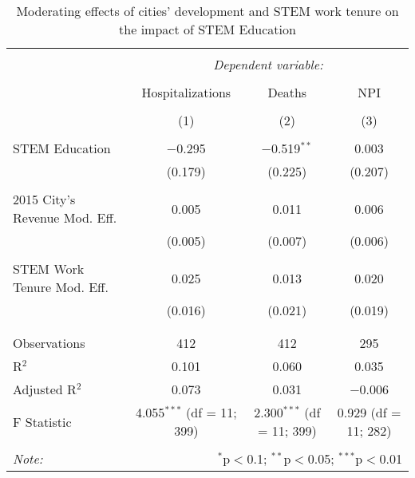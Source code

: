 
\begin{table}[!htbp] \centering 
  \caption{Moderating effects of cities’ development and STEM work tenure on the impact of STEM Education} 
  \label{} 
\begin{tabular}{@{\extracolsep{5pt}}lccc} 
\\[-1.8ex]\hline 
\hline \\[-1.8ex] 
 & \multicolumn{3}{c}{\textit{Dependent variable:}} \\ 
\cline{2-4} 
\\[-1.8ex] & Hospitalizations & Deaths & NPI \\ 
\\[-1.8ex] & (1) & (2) & (3)\\ 
\hline \\[-1.8ex] 
 STEM Education & $-$0.295 & $-$0.519$^{**}$ & 0.003 \\ 
  & (0.179) & (0.225) & (0.207) \\ 
  & & & \\ 
 2015 City's Revenue Mod. Eff. & 0.005 & 0.011 & 0.006 \\ 
  & (0.005) & (0.007) & (0.006) \\ 
  & & & \\ 
 STEM Work Tenure Mod. Eff. & 0.025 & 0.013 & 0.020 \\ 
  & (0.016) & (0.021) & (0.019) \\ 
  & & & \\ 
\hline \\[-1.8ex] 
Observations & 412 & 412 & 295 \\ 
R$^{2}$ & 0.101 & 0.060 & 0.035 \\ 
Adjusted R$^{2}$ & 0.073 & 0.031 & $-$0.006 \\ 
F Statistic & 4.055$^{***}$ (df = 11; 399) & 2.300$^{***}$ (df = 11; 399) & 0.929 (df = 11; 282) \\ 
\hline 
\hline \\[-1.8ex] 
\textit{Note:}  & \multicolumn{3}{r}{$^{*}$p$<$0.1; $^{**}$p$<$0.05; $^{***}$p$<$0.01} \\ 
\end{tabular} 
\end{table} 
